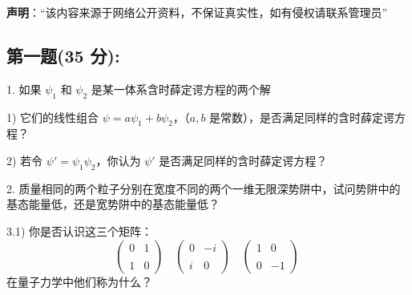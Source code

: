 
\textbf{声明}：“该内容来源于网络公开资料，不保证真实性，如有侵权请联系管理员”

\subsection{第一题(35 分):}
1. 如果 $\psi_1$ 和 $\psi_2$ 是某一体系含时薛定谔方程的两个解

1) 它们的线性组合 $\psi = a\psi_1 + b\psi_2$，（$a, b$ 是常数），是否满足同样的含时薛定谔方程？

2) 若令 $\psi' = \psi_1\psi_2$，你认为 $\psi'$ 是否满足同样的含时薛定谔方程？

2. 质量相同的两个粒子分别在宽度不同的两个一维无限深势阱中，试问势阱中的基态能量低，还是宽势阱中的基态能量低？

3.1) 你是否认识这三个矩阵：
\[\begin{pmatrix}0 & 1 \\\\1 & 0\end{pmatrix}\quad\begin{pmatrix}0 & -i \\\\i & 0\end{pmatrix}\quad\begin{pmatrix}1 & 0 \\\\0 & -1\end{pmatrix}~\]
在量子力学中他们称为什么？
